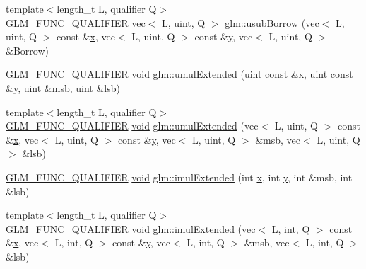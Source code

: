\begin{DoxyCompactItemize}
\item 
{\footnotesize template$<$length\+\_\+t L, qualifier Q$>$ }\\\mbox{\hyperlink{setup_8hpp_a33fdea6f91c5f834105f7415e2a64407}{G\+L\+M\+\_\+\+F\+U\+N\+C\+\_\+\+Q\+U\+A\+L\+I\+F\+I\+ER}} vec$<$ L, uint, Q $>$ \mbox{\hyperlink{group__core__func__integer_gae3316ba1229ad9b9f09480833321b053}{glm\+::usub\+Borrow}} (vec$<$ L, uint, Q $>$ const \&\mbox{\hyperlink{_s_d_l__opengl_8h_ad0e63d0edcdbd3d79554076bf309fd47}{x}}, vec$<$ L, uint, Q $>$ const \&\mbox{\hyperlink{_s_d_l__opengl_8h_a1675d9d7bb68e1657ff028643b4037e3}{y}}, vec$<$ L, uint, Q $>$ \&Borrow)
\item 
\mbox{\hyperlink{setup_8hpp_a33fdea6f91c5f834105f7415e2a64407}{G\+L\+M\+\_\+\+F\+U\+N\+C\+\_\+\+Q\+U\+A\+L\+I\+F\+I\+ER}} \mbox{\hyperlink{_s_d_l__opengles2__gl2ext_8h_ae5d8fa23ad07c48bb609509eae494c95}{void}} \mbox{\hyperlink{namespaceglm_a8d2521311c96c4b426be9857010b6b76}{glm\+::umul\+Extended}} (uint const \&\mbox{\hyperlink{_s_d_l__opengl_8h_ad0e63d0edcdbd3d79554076bf309fd47}{x}}, uint const \&\mbox{\hyperlink{_s_d_l__opengl_8h_a1675d9d7bb68e1657ff028643b4037e3}{y}}, uint \&msb, uint \&lsb)
\item 
{\footnotesize template$<$length\+\_\+t L, qualifier Q$>$ }\\\mbox{\hyperlink{setup_8hpp_a33fdea6f91c5f834105f7415e2a64407}{G\+L\+M\+\_\+\+F\+U\+N\+C\+\_\+\+Q\+U\+A\+L\+I\+F\+I\+ER}} \mbox{\hyperlink{_s_d_l__opengles2__gl2ext_8h_ae5d8fa23ad07c48bb609509eae494c95}{void}} \mbox{\hyperlink{group__core__func__integer_ga732e2fb56db57ea541c7e5c92b7121be}{glm\+::umul\+Extended}} (vec$<$ L, uint, Q $>$ const \&\mbox{\hyperlink{_s_d_l__opengl_8h_ad0e63d0edcdbd3d79554076bf309fd47}{x}}, vec$<$ L, uint, Q $>$ const \&\mbox{\hyperlink{_s_d_l__opengl_8h_a1675d9d7bb68e1657ff028643b4037e3}{y}}, vec$<$ L, uint, Q $>$ \&msb, vec$<$ L, uint, Q $>$ \&lsb)
\item 
\mbox{\hyperlink{setup_8hpp_a33fdea6f91c5f834105f7415e2a64407}{G\+L\+M\+\_\+\+F\+U\+N\+C\+\_\+\+Q\+U\+A\+L\+I\+F\+I\+ER}} \mbox{\hyperlink{_s_d_l__opengles2__gl2ext_8h_ae5d8fa23ad07c48bb609509eae494c95}{void}} \mbox{\hyperlink{namespaceglm_a940501aa5c66bc19f9ba6ddfe0110097}{glm\+::imul\+Extended}} (int \mbox{\hyperlink{_s_d_l__opengl_8h_ad0e63d0edcdbd3d79554076bf309fd47}{x}}, int \mbox{\hyperlink{_s_d_l__opengl_8h_a1675d9d7bb68e1657ff028643b4037e3}{y}}, int \&msb, int \&lsb)
\item 
{\footnotesize template$<$length\+\_\+t L, qualifier Q$>$ }\\\mbox{\hyperlink{setup_8hpp_a33fdea6f91c5f834105f7415e2a64407}{G\+L\+M\+\_\+\+F\+U\+N\+C\+\_\+\+Q\+U\+A\+L\+I\+F\+I\+ER}} \mbox{\hyperlink{_s_d_l__opengles2__gl2ext_8h_ae5d8fa23ad07c48bb609509eae494c95}{void}} \mbox{\hyperlink{group__core__func__integer_gac0c510a70e852f57594a9141848642e3}{glm\+::imul\+Extended}} (vec$<$ L, int, Q $>$ const \&\mbox{\hyperlink{_s_d_l__opengl_8h_ad0e63d0edcdbd3d79554076bf309fd47}{x}}, vec$<$ L, int, Q $>$ const \&\mbox{\hyperlink{_s_d_l__opengl_8h_a1675d9d7bb68e1657ff028643b4037e3}{y}}, vec$<$ L, int, Q $>$ \&msb, vec$<$ L, int, Q $>$ \&lsb)

\end{DoxyCompactItemize}
